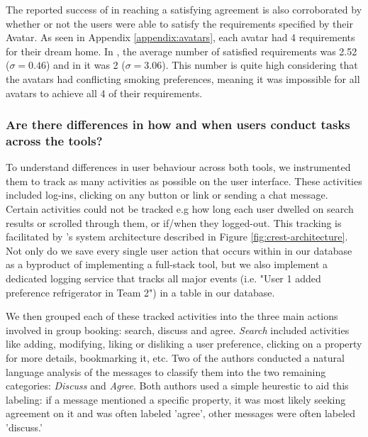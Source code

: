 The reported success of \tool in reaching a satisfying agreement is also corroborated by whether or not the users were able to satisfy the requirements specified by their Avatar. As seen in Appendix \ref{appendix:avatars}, each avatar had 4 requirements for their dream home. In \tool, the average number of satisfied requirements was 2.52 ($\sigma = 0.46$) and in \baseline it was 2 ($\sigma = 3.06$). This number is quite high considering that the avatars had conflicting smoking preferences, meaning it was impossible for all avatars to achieve all 4 of their requirements.

\subsubsection{Are there differences in how and when users conduct tasks across the tools?}

To understand differences in user behaviour across both tools, we instrumented them to track as many activities as possible on the user interface. These activities included log-ins, clicking on any button or link or sending a chat message. Certain activities could not be tracked e.g how long each user dwelled on search results or scrolled through them, or if/when they logged-out. This tracking is facilitated by \tool's system architecture described in Figure \ref{fig:crest-architecture}. Not only do we save every single user action that occurs within \tool in our database as a byproduct of implementing a full-stack tool, but we also implement a dedicated logging service that tracks all major events (i.e. "User 1 added preference refrigerator in Team 2") in a table in our database.

We then grouped each of these tracked activities into the three main actions involved in group booking: search, discuss and agree. \textit{Search} included activities like adding, modifying, liking or disliking a user preference, clicking on a property for more details, bookmarking it, etc. Two of the authors conducted a natural language analysis of the messages to classify them into the two remaining categories: \textit{Discuss} and \textit{Agree}. Both authors used a simple heurestic to aid this labeling: if a message mentioned a specific property, it was most likely seeking agreement on it and was often labeled 'agree', other messages were often labeled 'discuss.'

